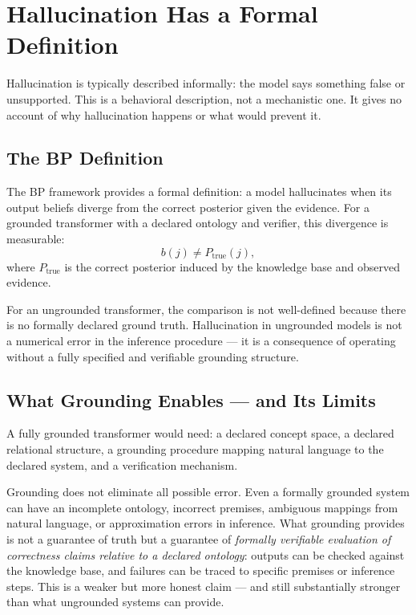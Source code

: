 \section{Hallucination Has a Formal Definition}
\label{sec:hallucination}

Hallucination is typically described informally: the model says something
false or unsupported. This is a behavioral description, not a mechanistic
one. It gives no account of why hallucination happens or what would prevent
it.

\subsection*{The BP Definition}

The BP framework provides a formal definition: a model hallucinates when
its output beliefs diverge from the correct posterior given the evidence.
For a grounded transformer with a declared ontology and verifier, this
divergence is measurable:
\[
b(j) \neq P_{\mathrm{true}}(j),
\]
where $P_{\mathrm{true}}$ is the correct posterior induced by the knowledge
base and observed evidence.

For an ungrounded transformer, the comparison is not well-defined because
there is no formally declared ground truth. Hallucination in ungrounded
models is not a numerical error in the inference procedure --- it is a
consequence of operating without a fully specified and verifiable grounding
structure.

\subsection*{What Grounding Enables --- and Its Limits}

A fully grounded transformer would need: a declared concept space, a
declared relational structure, a grounding procedure mapping natural
language to the declared system, and a verification mechanism.

Grounding does not eliminate all possible error. Even a formally grounded
system can have an incomplete ontology, incorrect premises, ambiguous
mappings from natural language, or approximation errors in inference.
What grounding provides is not a guarantee of truth but a guarantee of
\emph{formally verifiable evaluation of correctness claims relative to a
declared ontology}: outputs can be checked against the knowledge base,
and failures can be traced to specific premises or inference steps. This
is a weaker but more honest claim --- and still substantially stronger than
what ungrounded systems can provide.

